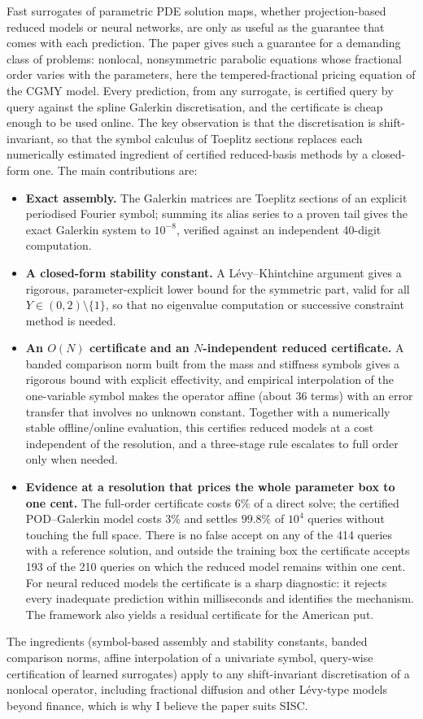 \documentclass[11pt]{article}
\begin{document}
Fast surrogates of parametric PDE solution maps, whether projection-based reduced models or
neural networks, are only as useful as the guarantee that comes with each prediction. The paper
gives such a guarantee for a demanding class of problems: nonlocal, nonsymmetric parabolic
equations whose fractional order varies with the parameters, here the tempered-fractional
pricing equation of the CGMY model. Every prediction, from any surrogate, is certified query by
query against the spline Galerkin discretisation, and the certificate is cheap enough to be used
online. The key observation is that the discretisation is shift-invariant, so that the symbol
calculus of Toeplitz sections replaces each numerically estimated ingredient of certified
reduced-basis methods by a closed-form one. The main contributions are:
\begin{itemize}[leftmargin=1.6em,itemsep=0.15em,topsep=0.2em]
\item \textbf{Exact assembly.} The Galerkin matrices are Toeplitz sections of an explicit
periodised Fourier symbol; summing its alias series to a proven tail gives the exact Galerkin
system to $10^{-8}$, verified against an independent 40-digit computation.
\item \textbf{A closed-form stability constant.} A L\'evy--Khintchine argument gives a rigorous,
parameter-explicit lower bound for the symmetric part, valid for all $Y\in(0,2)\setminus\{1\}$,
so that no eigenvalue computation or successive constraint method is needed.
\item \textbf{An $O(N)$ certificate and an $N$-independent reduced certificate.} A banded comparison
norm built from the mass and stiffness symbols gives a rigorous bound with explicit effectivity,
and empirical interpolation of the one-variable symbol makes the operator affine (about 36 terms)
with an error transfer that involves no unknown constant. Together with a numerically stable
offline/online evaluation, this certifies reduced models at a cost independent of the resolution,
and a three-stage rule escalates to full order only when needed.
\item \textbf{Evidence at a resolution that prices the whole parameter box to one cent.} The
full-order certificate costs $6\%$ of a direct solve; the certified POD--Galerkin model costs
$3\%$ and settles $99.8\%$ of $10^4$ queries without touching the full space. There is no false
accept on any of the 414 queries with a reference solution, and outside the training box the
certificate accepts 193 of the 210 queries on which the reduced model remains within one cent.
For neural reduced models the certificate is a sharp diagnostic: it rejects every inadequate
prediction within milliseconds and identifies the mechanism. The framework also yields a residual
certificate for the American put.
\end{itemize}
The ingredients (symbol-based assembly and stability constants, banded comparison norms, affine
interpolation of a univariate symbol, query-wise certification of learned surrogates) apply to any
shift-invariant discretisation of a nonlocal operator, including fractional diffusion and other
L\'evy-type models beyond finance, which is why I believe the paper suits SISC.
\end{document}
